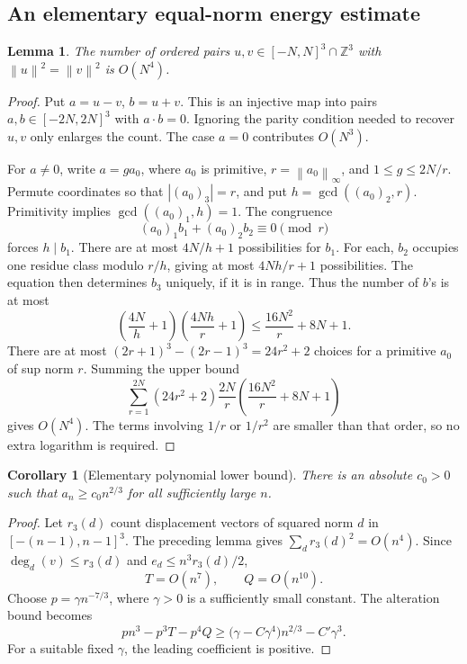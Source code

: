 \documentclass[11pt,letterpaper]{article}
\newtheorem{lemma}[theorem]{Lemma}
\newtheorem{corollary}[theorem]{Corollary}
\theoremstyle{definition}
\newcommand{\norm}[1]{\left\lVert #1\right\rVert}
\begin{document}
\subsection{An elementary equal-norm energy estimate}
\begin{lemma}
\label{lem:equal-norm}
The number of ordered pairs \(u,v\in[-N,N]^3\cap\mathbb Z^3\) with
\(\norm{u}^2=\norm{v}^2\) is \(O(N^4)\).
\end{lemma}
\begin{proof}
Put \(a=u-v\), \(b=u+v\). This is an injective map into pairs
\(a,b\in[-2N,2N]^3\) with \(a\cdot b=0\). Ignoring the parity
condition needed to recover \(u,v\) only enlarges the count.
The case \(a=0\) contributes \(O(N^3)\).

For \(a\ne0\), write \(a=g a_0\), where \(a_0\) is primitive,
\(r=\norm{a_0}_\infty\), and \(1\le g\le2N/r\).
Permute coordinates so that \(|(a_0)_3|=r\), and put
\(h=\gcd((a_0)_2,r)\). Primitivity implies
\(\gcd((a_0)_1,h)=1\). The congruence
\[
 (a_0)_1b_1+(a_0)_2b_2\equiv0\pmod r
\]
forces \(h\mid b_1\). There are at most \(4N/h+1\) possibilities
for \(b_1\). For each, \(b_2\) occupies one residue class modulo
\(r/h\), giving at most \(4Nh/r+1\) possibilities. The equation
then determines \(b_3\) uniquely, if it is in range. Thus the number
of \(b\)'s is at most
\[
 \left(\frac{4N}{h}+1\right)
 \left(\frac{4Nh}{r}+1\right)
 \le\frac{16N^2}{r}+8N+1.
\]
There are at most
\((2r+1)^3-(2r-1)^3=24r^2+2\) choices for a primitive \(a_0\)
of sup norm \(r\). Summing the upper bound
\[
 \sum_{r=1}^{2N}
 (24r^2+2)\frac{2N}{r}
 \left(\frac{16N^2}{r}+8N+1\right)
\]
gives \(O(N^4)\). The terms involving \(1/r\) or \(1/r^2\) are
smaller than that order, so no extra logarithm is required.
\end{proof}

\begin{corollary}[Elementary polynomial lower bound]
\label{cor:elementary-lower}
There is an absolute \(c_0>0\) such that
\(a_n\ge c_0 n^{2/3}\) for all sufficiently large \(n\).
\end{corollary}
\begin{proof}
Let \(r_3(d)\) count displacement vectors of squared norm \(d\)
in \([-(n-1),n-1]^3\). The preceding lemma gives
\(\sum_d r_3(d)^2=O(n^4)\). Since
\(\deg_d(v)\le r_3(d)\) and \(e_d\le n^3r_3(d)/2\),
\[
 T=O(n^7),\qquad Q=O(n^{10}).
\]
Choose \(p=\gamma n^{-7/3}\), where \(\gamma>0\) is a sufficiently
small constant. The alteration bound becomes
\[
 pn^3-p^3T-p^4Q
 \ge\bigl(\gamma-C\gamma^4\bigr)n^{2/3}-C'\gamma^3.
\]
For a suitable fixed \(\gamma\), the leading coefficient is positive.
\end{proof}
\end{document}
